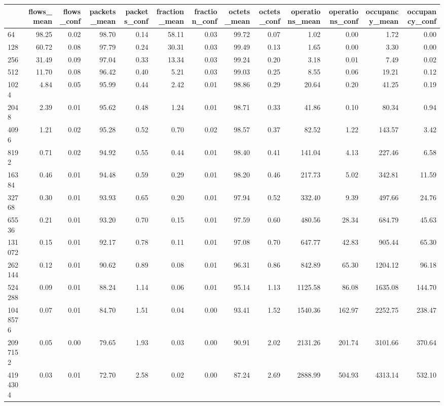 \begin{tabular}{lrrrrrrrrrrrr}
\toprule
 & flows_mean & flows_conf & packets_mean & packets_conf & fraction_mean & fraction_conf & octets_mean & octets_conf & operations_mean & operations_conf & occupancy_mean & occupancy_conf \\
\midrule
64 & 98.25 & 0.02 & 98.70 & 0.14 & 58.11 & 0.03 & 99.72 & 0.07 & 1.02 & 0.00 & 1.72 & 0.00 \\
128 & 60.72 & 0.08 & 97.79 & 0.24 & 30.31 & 0.03 & 99.49 & 0.13 & 1.65 & 0.00 & 3.30 & 0.00 \\
256 & 31.49 & 0.09 & 97.04 & 0.33 & 13.34 & 0.03 & 99.24 & 0.20 & 3.18 & 0.01 & 7.49 & 0.02 \\
512 & 11.70 & 0.08 & 96.42 & 0.40 & 5.21 & 0.03 & 99.03 & 0.25 & 8.55 & 0.06 & 19.21 & 0.12 \\
1024 & 4.84 & 0.05 & 95.99 & 0.44 & 2.42 & 0.01 & 98.86 & 0.29 & 20.64 & 0.20 & 41.25 & 0.19 \\
2048 & 2.39 & 0.01 & 95.62 & 0.48 & 1.24 & 0.01 & 98.71 & 0.33 & 41.86 & 0.10 & 80.34 & 0.94 \\
4096 & 1.21 & 0.02 & 95.28 & 0.52 & 0.70 & 0.02 & 98.57 & 0.37 & 82.52 & 1.22 & 143.57 & 3.42 \\
8192 & 0.71 & 0.02 & 94.92 & 0.55 & 0.44 & 0.01 & 98.40 & 0.41 & 141.04 & 4.13 & 227.46 & 6.58 \\
16384 & 0.46 & 0.01 & 94.48 & 0.59 & 0.29 & 0.01 & 98.20 & 0.46 & 217.73 & 5.02 & 342.81 & 11.59 \\
32768 & 0.30 & 0.01 & 93.93 & 0.65 & 0.20 & 0.01 & 97.94 & 0.52 & 332.40 & 9.39 & 497.66 & 24.76 \\
65536 & 0.21 & 0.01 & 93.20 & 0.70 & 0.15 & 0.01 & 97.59 & 0.60 & 480.56 & 28.34 & 684.79 & 45.63 \\
131072 & 0.15 & 0.01 & 92.17 & 0.78 & 0.11 & 0.01 & 97.08 & 0.70 & 647.77 & 42.83 & 905.44 & 65.30 \\
262144 & 0.12 & 0.01 & 90.62 & 0.89 & 0.08 & 0.01 & 96.31 & 0.86 & 842.89 & 65.30 & 1204.12 & 96.18 \\
524288 & 0.09 & 0.01 & 88.24 & 1.14 & 0.06 & 0.01 & 95.14 & 1.13 & 1125.58 & 86.08 & 1635.08 & 144.70 \\
1048576 & 0.07 & 0.01 & 84.70 & 1.51 & 0.04 & 0.00 & 93.41 & 1.52 & 1540.36 & 162.97 & 2252.75 & 238.47 \\
2097152 & 0.05 & 0.00 & 79.65 & 1.93 & 0.03 & 0.00 & 90.91 & 2.02 & 2131.26 & 201.74 & 3101.66 & 370.64 \\
4194304 & 0.03 & 0.01 & 72.70 & 2.58 & 0.02 & 0.00 & 87.24 & 2.69 & 2888.99 & 504.93 & 4313.14 & 532.10 \\

\end{tabular}
